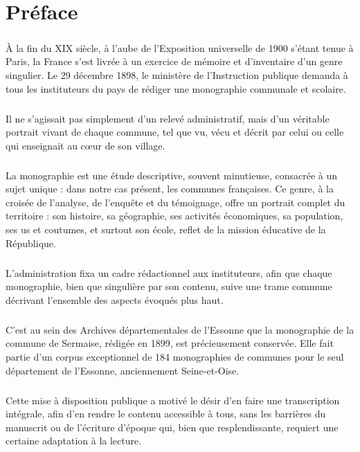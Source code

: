 \documentclass[../eBook.tex]{subfiles}
\begin{document}
  \chapter*{Préface}
    \paragraph{}À la fin du XIX siècle, à l'aube de l'Exposition universelle de 1900 s'étant tenue à Paris, la France s'est livrée à un exercice de mémoire et d'inventaire d'un genre singulier. Le 29 décembre 1898, le ministère de l'Instruction publique demanda à tous les instituteurs du pays de rédiger une monographie communale et scolaire.
    \paragraph{}Il ne s'agissait pas simplement d'un relevé administratif, mais d'un véritable portrait vivant de chaque commune, tel que vu, vécu et décrit par celui ou celle qui enseignait au cœur de son village.
    \paragraph{}La monographie est une étude descriptive, souvent minutieuse, consacrée à un sujet unique : dans notre cas présent, les communes françaises. Ce genre, à la croisée de l'analyse, de l'enquête et du témoignage, offre un portrait complet du territoire : son histoire, sa géographie, ses activités économiques, sa population, ses us et coutumes, et surtout son école, reflet de la mission éducative de la République.
    \paragraph{}L'administration fixa un cadre rédactionnel aux instituteurs, afin que chaque monographie, bien que singulière par son contenu, suive une trame commune décrivant l'ensemble des aspects évoqués plus haut.
    \paragraph{}C'est au sein des Archives départementales de l'Essonne que la monographie de la commune de Sermaise, rédigée en 1899, est précieusement conservée. Elle fait partie d'un corpus exceptionnel de 184 monographies de communes pour le seul département de l'Essonne, anciennement Seine-et-Oise.
    \paragraph{}Cette mise à disposition publique a motivé le désir d'en faire une transcription intégrale, afin d'en rendre le contenu accessible à tous, sans les barrières du manuscrit ou de l'écriture d'époque qui, bien que resplendissante, requiert une certaine adaptation à la lecture.
\end{document}
